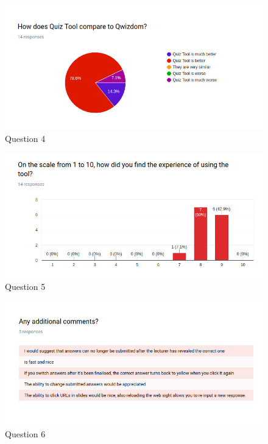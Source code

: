 \begin{figure}[h!]
    \centering
    \includegraphics[width=\textwidth]{Appendix7/4.png}
    \caption{Question 4}
    \label{fig:survey4}
\end{figure}

\begin{figure}[h!]
    \centering
    \includegraphics[width=\textwidth]{Appendix7/5.png}
    \caption{Question 5}
    \label{fig:survey5}
\end{figure}

\begin{figure}[h!]
    \centering
    \includegraphics[width=\textwidth]{Appendix7/6.png}
    \caption{Question 6}
    \label{fig:survey6}
\end{figure}
